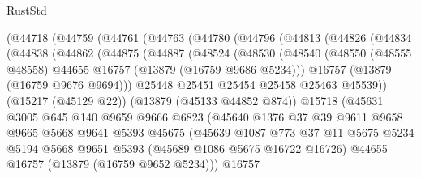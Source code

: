 \begin{lexlean}{RustStd}
\begin{coremodule}
    (@44718
      (@44759
        (@44761
          (@44763
            (@44780
              (@44796
                (@44813
                  (@44826
                    (@44834
                      (@44838
                        (@44862
                          (@44875
                            (@44887
                              (@48524
                                (@48530
                                  (@48540
                                    (@48550
                                      (@48555 @48558)
                                      @44655
                                      @16757
                                      (@13879 (@16759 @9686 @5234)))
                                    @16757
                                    (@13879 (@16759 @9676 @9694)))
                                  @25448
                                  @25451
                                  @25454
                                  @25458
                                  @25463
                                  @45539))
                              (@15217 (@45129 @22))
                              (@13879 (@45133 @44852 @874))
                              @15718
                              (@45631
                                @3005
                                @645
                                @140
                                @9659
                                @9666
                                @6823
                                (@45640
                                  @1376
                                  @37
                                  @39
                                  @9611
                                  @9658
                                  @9665
                                  @5668
                                  @9641
                                  @5393
                                  @45675
                                  (@45639
                                    @1087
                                    @773
                                    @37
                                    @11
                                    @5675
                                    @5234
                                    @5194
                                    @5668
                                    @9651
                                    @5393
                                    (@45689 @1086 @5675 @16722 @16726)
                                    @44655
                                    @16757
                                    (@13879 (@16759 @9652 @5234)))
                                  @16757

\end{coremodule}
\end{lexlean}
